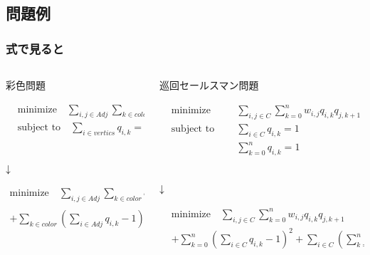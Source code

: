 \subsection{問題例}
\begin{frame}
  \frametitle{式で見ると}
    \begin{columns}[T]
      \begin{column}{0.47\textwidth}
        {\large 彩色問題}
        \footnotesize{
        \[
          \begin{aligned}
              &\text{minimize} \quad \sum_{i,j\in Adj}\sum_{k\in color}q_{i,k}q_{j,k} \\
              &\text{subject to} \quad \sum_{i\in vertics}q_{i,k} = 1 
          \end{aligned}
        \]\\
        \begin{center}
          ${\large \downarrow}$
        \end{center}
        \begin{tcolorbox}[top=0mm, left=0mm, right=0mm, bottom=0mm]
        \[
          \begin{aligned}
              \text{minimize} \quad \sum_{i,j\in Adj}\sum_{k\in color}q_{i,k}q_{j,k}\\
               + \sum_{k\in color}(\sum_{i\in Adj}q_{i,k}-1)^2\\
          \end{aligned}
        \]  
        \end{tcolorbox}
        }
      \end{column}  

      \begin{column}{0.55\textwidth}
        {\large 巡回セールスマン問題}
        \footnotesize{
        \[
          \begin{aligned}
              &\text{minimize} \quad  & & \sum_{i,j\in C}\sum_{k = 0}^n w_{i,j}q_{i,k}q_{j,k+1} \\
              &\text{subject to} \quad& & \sum_{i\in C}q_{i,k} = 1 \\
              &                       & & \sum_{k = 0}^n q_{i,k} = 1
          \end{aligned}
        \]\\
        \begin{center}
          ${\large \downarrow}$
        \end{center}
        \begin{tcolorbox}[top=0mm, left=1mm, right=0mm, bottom=0mm]
        \[
          \begin{aligned}
              &\text{minimize} \quad \sum_{i,j\in C}\sum_{k = 0}^n w_{i,j}q_{i,k}q_{j,k+1}\\
               &+ \sum_{k=0}^n(\sum_{i\in C}q_{i,k}-1)^2+\sum_{i\in C}(\sum_{k=0}^nq_{i,k}-1)^2\\
          \end{aligned}
        \]  
        \end{tcolorbox}
        }
      \end{column}  
    \end{columns}
\end{frame}

